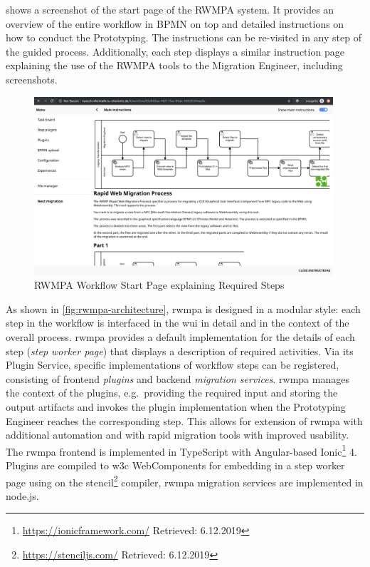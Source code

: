  shows a screenshot of the start page of the RWMPA system.
It provides an overview of the entire workflow in BPMN on top and detailed instructions on how to conduct the Prototyping.
The instructions can be re-visited in any step of the guided process.
Additionally, each step displays a similar instruction page explaining the use of the RWMPA tools to the Migration Engineer, including screenshots.

\begin{figure}[h]
\hypertarget{fig:awsm.rm.rwmpa.screenshot.start}{%
\centering
\includegraphics[width=0.99\textwidth]{../figures/screenshots/rwmpa-start.png}
\caption{RWMPA Workflow Start Page explaining Required Steps}\label{fig:awsm.rm.rwmpa.screenshot.start}
}
\end{figure}

As shown in \cref{fig:rwmpa-architecture}, \gls{rwmpa} is designed in a modular style: each step in the workflow is interfaced in the \gls{wui} in detail and in the context of the overall process.
\gls{rwmpa} provides a default implementation for the details of each step (\emph{step worker page}) that displays a description of required activities.
Via its Plugin Service, specific implementations of workflow steps can be registered, consisting of frontend \emph{plugins} and backend \emph{migration services}.
\gls{rwmpa} manages the context of the plugins, e.g.~providing the required input and storing the output artifacts and invokes the plugin implementation when the Prototyping Engineer reaches the corresponding step.
This allows for extension of \gls{rwmpa} with additional automation and with rapid \web migration tools with improved usability.
The \gls{rwmpa} frontend is implemented in TypeScript with Angular-based Ionic\footnote{\url{https://ionicframework.com/} Retrieved: 6.12.2019} 4.
Plugins are compiled to \gls{w3c} WebComponents \autocite{W3C2018WebComponents} for embedding in a step worker page using on the stencil\footnote{\url{https://stenciljs.com/} Retrieved: 6.12.2019} compiler, \gls{rwmpa} migration services are implemented in node.js.


